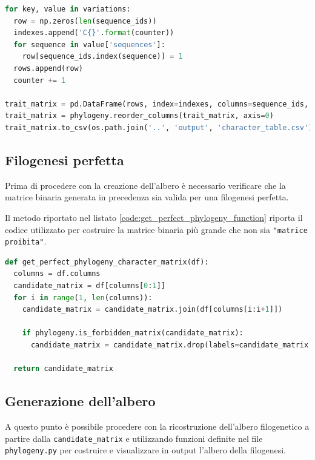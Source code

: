 \documentclass[11pt,italian]{article}
\begin{document}
\begin{lstlisting}[caption=Generazione della matrice binaria di caratteri,label=code:creation table.csv,language=Python]
for key, value in variations:
  row = np.zeros(len(sequence_ids))
  indexes.append('C{}'.format(counter))
  for sequence in value['sequences']:
    row[sequence_ids.index(sequence)] = 1
  rows.append(row)
  counter += 1

trait_matrix = pd.DataFrame(rows, index=indexes, columns=sequence_ids, dtype=np.uint8).transpose()
trait_matrix = phylogeny.reorder_columns(trait_matrix, axis=0)
trait_matrix.to_csv(os.path.join('..', 'output', 'character_table.csv'))
\end{lstlisting}

\subsection{Filogenesi perfetta}
Prima di procedere con la creazione dell'albero è necessario verificare che la matrice binaria generata in precedenza sia valida per una filogenesi perfetta.

Il metodo riportato nel listato \ref{code:get_perfect_phylogeny_function} riporta il codice utilizzato
per costruire la matrice binaria più grande che non sia \lstinline{"matrice proibita"}.

\begin{lstlisting}[caption=Funzione di generazione della matrice binaria per filogenesi perfetta,label=code:get_perfect_phylogeny_function,language=Python]
def get_perfect_phylogeny_character_matrix(df):
  columns = df.columns
  candidate_matrix = df[columns[0:1]]
  for i in range(1, len(columns)):
    candidate_matrix = candidate_matrix.join(df[columns[i:i+1]])

    if phylogeny.is_forbidden_matrix(candidate_matrix):
      candidate_matrix = candidate_matrix.drop(labels=candidate_matrix.columns[-1], axis=1)

  return candidate_matrix
\end{lstlisting}

\subsection{Generazione dell'albero}
A questo punto è possibile procedere con la ricostruzione dell'albero filogenetico a partire dalla \lstinline{candidate_matrix} e utilizzando funzioni definite nel file \lstinline{phylogeny.py} per costruire e visualizzare in output l'albero della filogenesi.
\end{document}
